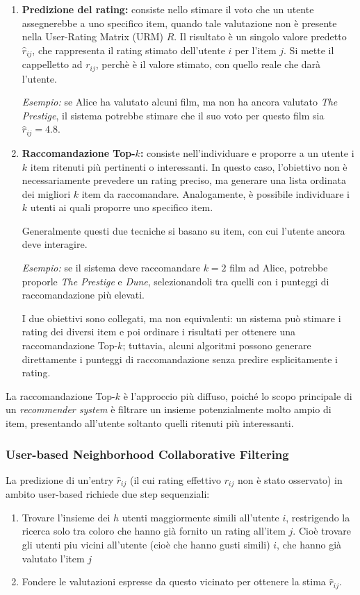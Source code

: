 \begin{enumerate}
    \item \textbf{Predizione del rating:} consiste nello stimare il voto che un utente assegnerebbe a uno specifico item, quando tale valutazione non è presente nella User-Rating Matrix (URM) $R$. Il risultato è un singolo valore predetto $\hat{r}_{ij}$, che rappresenta il rating stimato dell'utente $i$ per l'item $j$.
    Si mette il cappelletto ad $r_{ij}$, perchè è il valore stimato, con quello reale che darà l'utente.

    \textit{Esempio:} se Alice ha valutato alcuni film, ma non ha ancora valutato \textit{The Prestige}, il sistema potrebbe stimare che il suo voto per questo film sia $\hat{r}_{ij}=4.8$.

    \item \textbf{Raccomandazione Top-$k$:} consiste nell'individuare e proporre a un utente i $k$ item ritenuti più pertinenti o interessanti. In questo caso, l'obiettivo non è necessariamente prevedere un rating preciso, ma generare una lista ordinata dei migliori $k$ item da raccomandare. Analogamente, è possibile individuare i $k$ utenti ai quali proporre uno specifico item.

    Generalmente questi due tecniche si basano su item, con cui l'utente ancora deve interagire.

    \textit{Esempio:} se il sistema deve raccomandare $k=2$ film ad Alice, potrebbe proporle \textit{The Prestige} e \textit{Dune}, selezionandoli tra quelli con i punteggi di raccomandazione più elevati.

    I due obiettivi sono collegati, ma non equivalenti: un sistema può stimare i rating dei diversi item e poi ordinare i risultati per ottenere una raccomandazione Top-$k$; tuttavia, alcuni algoritmi possono generare direttamente i punteggi di raccomandazione senza predire esplicitamente i rating.
\end{enumerate}

La raccomandazione Top-$k$ è l'approccio più diffuso, poiché lo scopo principale di un \textit{recommender system} è filtrare un insieme potenzialmente molto ampio di item, presentando all'utente soltanto quelli ritenuti più interessanti.

\subsubsection{User-based Neighborhood Collaborative Filtering}
La predizione di un'entry $\hat{r}_{ij}$ (il cui rating effettivo \(r_{ij}\) non è stato osservato) in ambito user-based richiede due step sequenziali:
\begin{enumerate}
\item Trovare l'insieme dei $h$ utenti maggiormente simili all'utente $i$, restrigendo la ricerca solo tra coloro che hanno già fornito un rating all'item $j$.
Cioè trovare gli utenti piu vicini all'utente (cioè che hanno gusti simili) $i$, che hanno già valutato l'item $j$
\item Fondere le valutazioni espresse da questo vicinato per ottenere la stima $\hat{r}_{ij}$.
\end{enumerate}

